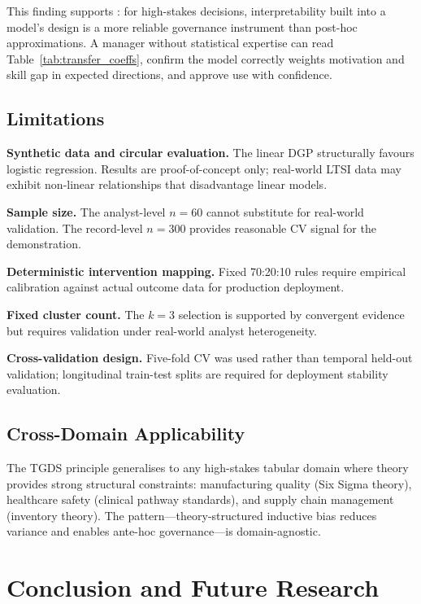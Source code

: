\documentclass[11pt,a4paper]{article}
\begin{document}
This finding supports \citet{rudin2019}: for high-stakes decisions, interpretability built into a model's design is a more reliable governance instrument than post-hoc approximations. A manager without statistical expertise can read Table~\ref{tab:transfer_coeffs}, confirm the model correctly weights motivation and skill gap in expected directions, and approve use with confidence.

\subsection{Limitations}

\textbf{Synthetic data and circular evaluation.} The linear DGP structurally favours logistic regression. Results are proof-of-concept only; real-world LTSI data may exhibit non-linear relationships that disadvantage linear models.

\textbf{Sample size.} The analyst-level $n = 60$ cannot substitute for real-world validation. The record-level $n = 300$ provides reasonable CV signal for the demonstration.

\textbf{Deterministic intervention mapping.} Fixed 70:20:10 rules require empirical calibration against actual outcome data for production deployment.

\textbf{Fixed cluster count.} The $k = 3$ selection is supported by convergent evidence but requires validation under real-world analyst heterogeneity.

\textbf{Cross-validation design.} Five-fold CV was used rather than temporal held-out validation; longitudinal train-test splits are required for deployment stability evaluation.

\subsection{Cross-Domain Applicability}

The TGDS principle generalises to any high-stakes tabular domain where theory provides strong structural constraints: manufacturing quality (Six Sigma theory), healthcare safety (clinical pathway standards), and supply chain management (inventory theory). The pattern---theory-structured inductive bias reduces variance and enables ante-hoc governance---is domain-agnostic.

\section{Conclusion and Future Research}
\label{sec:future}
\end{document}
